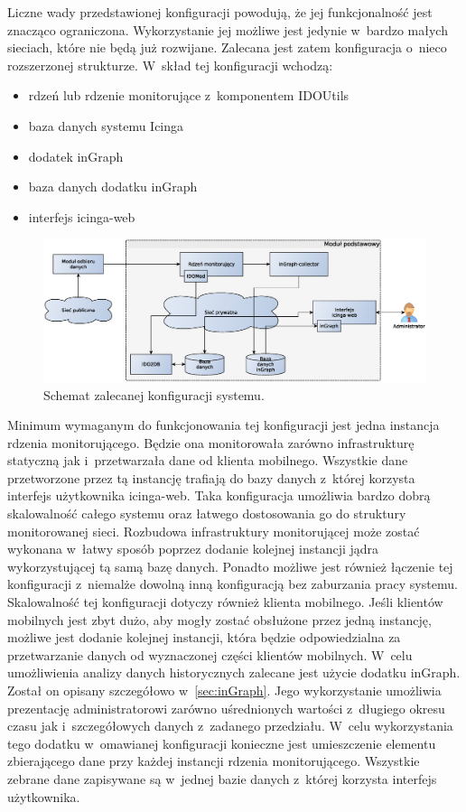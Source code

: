 Liczne wady przedstawionej konfiguracji powodują, że jej
funkcjonalność jest znacząco ograniczona. Wykorzystanie jej możliwe
jest jedynie w~bardzo małych sieciach, które nie będą już
rozwijane. Zalecana jest zatem konfiguracja o~nieco rozszerzonej
strukturze. W~skład tej konfiguracji wchodzą:

\begin{itemize}
\item rdzeń lub rdzenie monitorujące z~komponentem IDOUtils
\item baza danych systemu Icinga
\item dodatek inGraph
\item baza danych dodatku inGraph
\item interfejs icinga-web
\end{itemize}

\begin{figure}[ht]
\centering
  \caption{Schemat zalecanej konfiguracji systemu.}
  \label{fig:modulPodstawowy}
\includegraphics[width=1\textwidth]{img/modulPodstawowy}
\end{figure}

Minimum wymaganym do funkcjonowania tej konfiguracji jest jedna
instancja rdzenia monitorującego. Będzie ona monitorowała zarówno
infrastrukturę statyczną jak i~przetwarzała dane od klienta
mobilnego. Wszystkie dane przetworzone przez tą instancję trafiają do
bazy danych z~której korzysta interfejs użytkownika icinga-web. Taka
konfiguracja umożliwia bardzo dobrą skalowalność całego systemu oraz
łatwego dostosowania go do struktury monitorowanej sieci. Rozbudowa
infrastruktury monitorującej może zostać wykonana w~łatwy sposób
poprzez dodanie kolejnej instancji jądra wykorzystującej tą samą bazę
danych. Ponadto możliwe jest również łączenie tej konfiguracji
z~niemalże dowolną inną konfiguracją bez zaburzania pracy
systemu. Skalowalność tej konfiguracji dotyczy również klienta
mobilnego. Jeśli klientów mobilnych jest zbyt dużo, aby mogły zostać
obsłużone przez jedną instancję, możliwe jest dodanie kolejnej
instancji, która będzie odpowiedzialna za przetwarzanie danych od
wyznaczonej części klientów mobilnych. W~celu umożliwienia analizy
danych historycznych zalecane jest użycie dodatku inGraph. Został on
opisany szczegółowo w~\ref{sec:inGraph}. Jego wykorzystanie umożliwia
prezentację administratorowi zarówno uśrednionych wartości z~długiego
okresu czasu jak i~szczegółowych danych z~zadanego przedziału. W~celu
wykorzystania tego dodatku w~omawianej konfiguracji konieczne jest
umieszczenie elementu zbierającego dane przy każdej instancji rdzenia
monitorującego. Wszystkie zebrane dane zapisywane są w~jednej bazie
danych z~której korzysta interfejs użytkownika.



